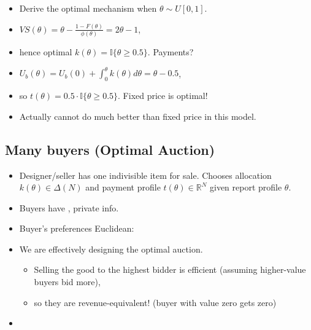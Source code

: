 \documentclass[english]{beamer}		%
\def\lyxframeend{} %
\begin{document}
\begin{itemize}[<+->]
	\item Derive the optimal mechanism when $\theta \sim U[0,1]$.
	\item $VS(\theta) = \theta - \frac{1-F(\theta)}{\phi(\theta)} = 2 \theta - 1$,
	\item hence optimal $k(\theta) = \mathbb{I} \{\theta \geq 0.5 \}$. Payments?
	\item $U_b (\theta) = U_b(0) + \int_0^\theta k(\theta) d\theta = \theta - 0.5$,
	\item so $t(\theta) = 0.5 \cdot \mathbb{I} \{\theta \geq 0.5 \}$. Fixed price is optimal!
	\item Actually cannot do much better than fixed price in this model.
\end{itemize}
\lyxframeend


\subsection{Many buyers (Optimal Auction)}

\begin{itemize}
	\item Designer/seller has one indivisible item for sale. Chooses allocation $k(\theta) \in \varDelta(N)$ and payment profile $t(\theta) \in \mathbb{R}^N$ given report profile $\theta$.
	\item Buyers have , private info.
	\item Buyer's preferences Euclidean: 
\end{itemize}
\lyxframeend


\begin{itemize}
	\item We are effectively designing the optimal auction.
	\begin{itemize}
		\item Selling the good to the highest bidder is efficient (assuming higher-value buyers bid more),
		\item so they are revenue-equivalent! (buyer with value zero gets zero)
	\end{itemize}
	\item 
\end{itemize}
\lyxframeend
\end{document}
